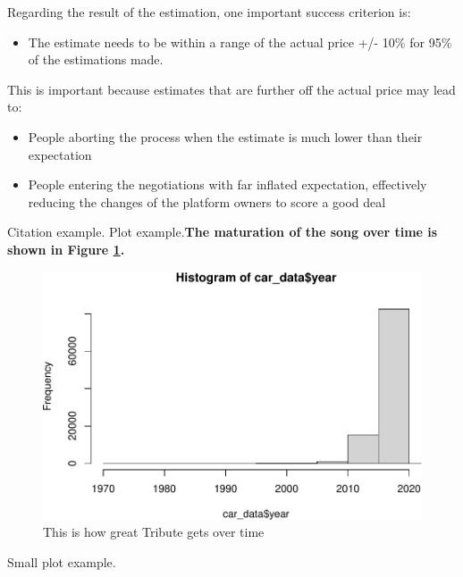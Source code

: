 \documentclass[sigchi]{acmart}
\def\tightlist{}
\begin{document}
Regarding the result of the estimation, one important success criterion is:

\begin{itemize}
\tightlist
\item
  The estimate needs to be within a range of the actual price +/- 10\% for 95\% of the estimations made.
\end{itemize}

This is important because estimates that are further off the actual price may lead to:

\begin{itemize}
\tightlist
\item
  People aborting the process when the estimate is much lower than their expectation
\item
  People entering the negotiations with far inflated expectation, effectively reducing the changes of the platform owners to score a good deal
\end{itemize}

Citation example.\citep{Aditya}
Plot example.\textbf{The maturation of the song over time is shown in Figure \ref{fig:tribute-plot}.}

\begin{figure}
\includegraphics[width=0.98\columnwidth]{step6_files/figure-latex/tribute-plot-1} \caption{This is how great Tribute gets over time}\label{fig:tribute-plot}
\end{figure}

Small plot example.
\end{document}
